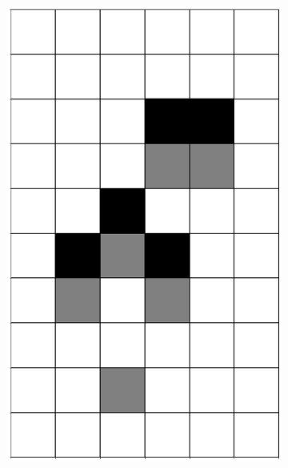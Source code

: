 \documentclass[12pt]{article}
\numberwithin{figure}{section} %
\begin{document}
\begin{figure}[H]
\begin{subfigure}{0.3\textwidth}
     		\includegraphics[angle=270,width=\linewidth]{Section4/3.1}
     		\subcaption{}
   	\end{subfigure}
        	\begin{subfigure}{0.3\textwidth}
     		\centering

\end{subfigure}
\end{figure}
\end{document}
